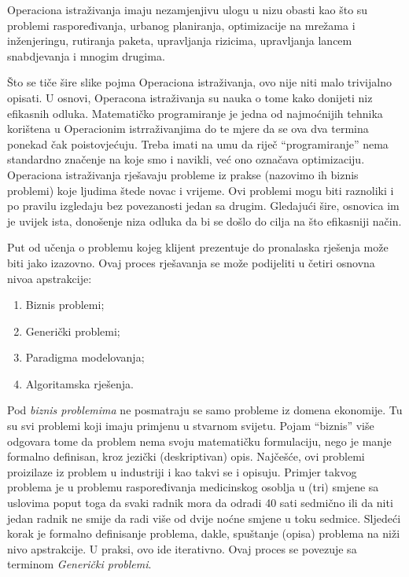 \documentclass[a4paper, utf8, 11pt, colorlinks]{article}
\begin{document}
 Operaciona istraživanja imaju nezamjenjivu ulogu u nizu obasti kao što su problemi raspoređivanja, urbanog planiranja, optimizacije na mrežama i inženjeringu, rutiranja paketa, upravljanja rizicima, upravljanja lancem snabdjevanja i mnogim drugima. 

 Što se tiče   šire slike pojma Operaciona istraživanja, ovo nije niti malo trivijalno opisati. U osnovi, Operacona istraživanja su nauka o tome kako donijeti niz efikasnih odluka. Matematičko programiranje je jedna od najmoćnijih tehnika 
 korištena u Operacionim istrraživanjima do te mjere da  se   ova dva termina ponekad čak poistovjećuju. Treba imati na umu da riječ ``programiranje'' nema standardno značenje na koje smo i navikli, već ono označava optimizaciju. Operaciona istraživanja rješavaju probleme iz prakse (nazovimo ih biznis problemi) koje ljudima štede novac i vrijeme. Ovi problemi mogu biti raznoliki i po pravilu izgledaju bez povezanosti jedan sa drugim. Gledajući šire, osnovica im je uvijek ista, donošenje niza odluka da bi se došlo do cilja na što efikasniji način.  %

  Put od učenja o problemu kojeg klijent prezentuje do pronalaska rješenja može biti jako izazovno. Ovaj proces rješavanja se može podijeliti u četiri osnovna nivoa apstrakcije:
  \begin{enumerate}
      \item Biznis problemi;
      \item Generički problemi; 
      \item Paradigma modelovanja;
      \item Algoritamska rješenja. 
  \end{enumerate}
  
 Pod \emph{biznis problemima} ne posmatraju se  samo probleme iz domena ekonomije. Tu su svi problemi koji imaju primjenu u stvarnom svijetu. Pojam ``biznis'' više odgovara tome da problem nema svoju matematičku formulaciju, nego je manje formalno definisan, kroz jezički (deskriptivan) opis.  Najčešće, ovi problemi proizilaze iz problem u industriji i kao takvi se i opisuju. Primjer takvog problema je u problemu raspoređivanja medicinskog osoblja u (tri) smjene sa uslovima poput toga da svaki radnik mora da odradi 40 sati sedmično ili da niti jedan radnik ne smije da radi više od dvije noćne smjene u toku sedmice. Sljedeći korak 
 je formalno definisanje problema, dakle, spuštanje (opisa) problema na niži nivo apstrakcije. U praksi, ovo ide iterativno. Ovaj proces se povezuje sa terminom \emph{Generički problemi}. 
\end{document}
